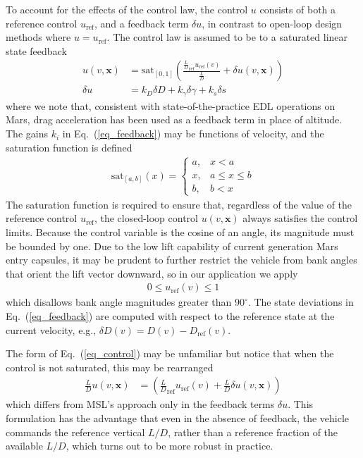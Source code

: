 \documentclass[journal ]{new-aiaa}
\newcommand{\state}{\ensuremath{\mathbf{x}}}
\newcommand{\ur}{\ensuremath{u_{\mathrm{ref}}}}
\begin{document}
To account for the effects of the control law, the control $u$ consists of both a reference control $\ur$, and a feedback term $\delta u$, in contrast to open-loop design methods where $u=\ur$. 
The control law is assumed to be to a saturated linear state feedback 
\begin{align}
u(v,\state) &= \mathrm{sat}_{[0,1]}\left(\frac{\frac{L}{D}_{\mathrm{ref}}\ur(v)}{\frac{L}{D}} + \delta u(v,\state)\right) \label{eq_control}\\
\delta u &= k_D\delta D + k_{\gamma}\delta\gamma + k_s\delta s \label{eq_feedback}
\end{align}
where we note that, consistent with state-of-the-practice EDL operations on Mars, drag acceleration has been used as a feedback term in place of altitude. 
The gains $k_i$ in Eq.~(\ref{eq_feedback}) may be functions of velocity, and the saturation function is defined
\begin{align*}
\mathrm{sat}_{[a,b]}(x) = \left\{\begin{array}{lc}
        a, &  x < a\\
        x, &  a\le x \le b\\
        b, &  b < x
        \end{array} \right. %
\end{align*}
The saturation function is required to ensure that, regardless of the value of the reference control \ur, the closed-loop control $u(v,\state)$ always satisfies the control limits. Because the control variable is the cosine of an angle, its magnitude must be bounded by one. Due to the low lift capability of current generation Mars entry capsules, it may be prudent to further restrict the vehicle from bank angles that orient the lift vector downward, so in our application we apply
\begin{align}
	0 \le \ur(v) \le 1 \label{eq_control_bounds}
\end{align}
which disallows bank angle magnitudes greater than $90^\circ$.
The state deviations in Eq.~(\ref{eq_feedback}) are computed with respect to the reference state at the current velocity, e.g., $\delta D(v) = D(v) - D_{\mathrm{ref}}(v)$.

The form of Eq.~(\ref{eq_control}) may be unfamiliar but notice that when the control is not saturated, this may be rearranged 
\begin{align}
	\frac{L}{D}u(v,\state) &= \left(\frac{L}{D}_{\mathrm{ref}}\ur(v) + \frac{L}{D}\delta u(v,\state)\right) 
\end{align}
which differs from MSL's approach only in the feedback terms $\delta u$. This formulation has the advantage that even in the absence of feedback, the vehicle commands the reference vertical $ L/D $, rather than a reference fraction of the available $  L/D $, which turns out to be more robust in practice.
\end{document}
